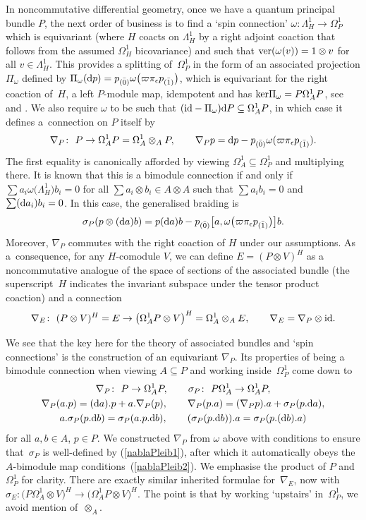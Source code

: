 \documentclass[10pt,a4paper]{amsart}
\numberwithin{equation}{section}
\newcommand{\<}{{\langle}}
\renewcommand{\>}{{\rangle}}
\renewcommand{\ker}{{\rm{ker}}}
\newcommand{\tens}{\otimes}
\newcommand{\id}{{\rm id}}
\newcommand{\extd}{{\rm d}}
\newcommand{\eps}{\epsilon}
\newcommand{\co}{{}_{\scriptstyle \bar{(1)}}}
\newcommand{\rz}{{}_{\scriptstyle \bar{(0)}}}
\newcommand{\ver}{{\rm ver}}
\begin{document}
In noncommutative differential geometry, once we have a quantum principal bundle $P$, the next order of business is to find a `spin connection' $\omega\colon \Lambda^1_H\to \Omega^1_P$ which is equivariant (where $H$ coacts on $\Lambda^1_H$ by a right adjoint coaction that follows from the assumed $\Omega^1_H$ bicovariance) and such that $\ver(\omega(v))=1\tens v$ for all $v\in\Lambda^1_H$. This provides a splitting of~$\Omega^1_P$ in the form of an associated projection $\Pi_\omega$ defined by $\Pi_\omega(\extd p)=p\rz\omega\big(\varpi\pi_\eps p\co\big)$, which is equivariant for the right coaction of~$H$, a left $P$-module map, idempotent and has $\ker\Pi_\omega=P\Omega^1_AP$, see~\cite{BrzMa} and \cite[Chapter~5]{BegMa}. We also require $\omega$ to be such that $(\id-\Pi_\omega)\extd P\subseteq \Omega^1_AP$, in which case it defines a~connection on $P$ itself by
\[ \nabla_P\colon \ P\to \Omega^1_AP=\Omega^1_A\tens_A P,\qquad \nabla_P p= \extd p- p\rz\omega(\varpi\pi_\eps p\co).\]
The first equality is canonically afforded by viewing $\Omega^1_A\subseteq\Omega^1_P$ and multiplying there.
It is known\cite[Proposition~5.50]{BegMa} that this is a bimodule connection if and only if $\sum a_i\omega\big(\Lambda^1_H\big)b_i=0$ for all $\sum a_i \tens b_i\in A\tens A$ such that $\sum a_ib_i=0$ and $\sum (\extd a_i)b_i=0$. In this case, the generalised braiding is
\[ \sigma_P(p\tens (\extd a) b)= p(\extd a)b-p\rz \big[a,\omega\big(\varpi\pi_\eps p\co\big)\big]b.\]
Moreover, $\nabla_P$ commutes with the right coaction of $H$ under our assumptions. As a~consequence, for any $H$-comodule $V$, we can define $E=(P\tens V)^H$ as a noncommutative analogue of the space of sections of the associated bundle (the superscript~$H$ indicates the invariant subspace under the tensor product coaction) and a connection~\cite{BegMa, BrzMa}
\[ \nabla_E\colon \ (P\tens V)^H=E\to \big(\Omega^1_A P\tens V\big)^H=\Omega^1_A\tens_A E,\qquad \nabla_E=\nabla_P\tens \id.\]

We see that the key here for the theory of associated bundles and `spin connections' is the construction of an equivariant $\nabla_P$. Its properties of being a bimodule connection when viewing $A\subseteq P$ and working inside~$\Omega^1_P$ come down to
\begin{gather} \nabla_P\colon \ P\to \Omega^1_AP,\qquad \sigma_P\colon \ P\Omega^1_A\to \Omega^1_AP,\nonumber\\
 \label{nablaPleib1} \nabla_P(a.p) =(\extd a).p+ a.\nabla_P(p),\qquad \nabla_P(p.a)=(\nabla_P p).a+ \sigma_P(p.\extd a),\\ \label{nablaPleib2} a.\sigma_P(p.\extd b) =\sigma_P(a.p.\extd b),\qquad (\sigma_P(p.\extd b)).a=\sigma_P(p.(\extd b).a)\end{gather}
 for all $a,b\in A$, $p\in P$. We constructed $\nabla_P$ from $\omega$ above with conditions to ensure that~$\sigma_P$ is well-defined by (\ref{nablaPleib1}), after which it automatically obeys the $A$-bimodule map conditions~(\ref{nablaPleib2}). We emphasise the product of $P$ and $\Omega^1_P$ for clarity. There are exactly similar inherited formulae for~$\nabla_E$, now with $\sigma_E\colon \big(P\Omega^1_A\tens V\big)^H\to \big(\Omega^1_AP\tens V\big)^H$. The point is that by working `upstairs' in~$\Omega^1_P$, we avoid mention of~$\tens_A$.
\end{document}
